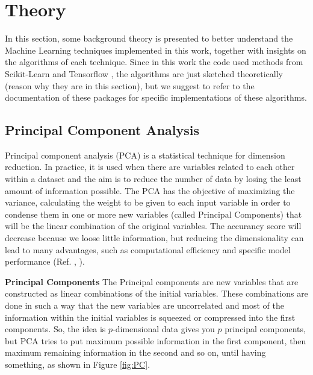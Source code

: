 \documentclass[english,notitlepage,reprint,nofootinbib]{revtex4-1}  %
\begin{document}
\section{Theory} \label{sec:theory}
In this section, some background theory is presented to better understand the Machine Learning techniques implemented in this work, together with insights on the algorithms of each technique. Since in this work the code used methods from Scikit-Learn \cite{sk} and Tensorflow \cite{tf}, the algorithms are just sketched theoretically (reason why they are in this section), but we suggest to refer to the documentation of these packages for specific implementations of these algorithms.

\subsection{Principal Component Analysis} \label{sec:pc}

Principal component analysis (PCA) is a statistical technique for dimension reduction. In practice, it is used when there are variables related to each other within a dataset and the aim is to reduce the number of data by losing the least amount of information possible.
The PCA has the objective of maximizing the variance, calculating the weight to be given to each input variable in order to condense them in one or more new variables (called Principal Components) that will be the linear combination of the original variables.
The accurancy score will decrease because we loose little information, but reducing the dimensionality can lead to many advantages, such as computational efficiency and specific model performance (Ref. \cite{pc1}, \cite{pc}).

\textbf{Principal Components}
The Principal components are new variables that are constructed as linear combinations of the initial variables. These combinations are done in such a way that the new variables are uncorrelated and most of the information within the initial variables is squeezed or compressed into the first components. So, the idea is $p$-dimensional data gives you $p$ principal components, but PCA tries to put maximum possible information in the first component, then maximum remaining information in the second and so on, until having something, as shown in Figure \ref{fig:PC}.
\end{document}
